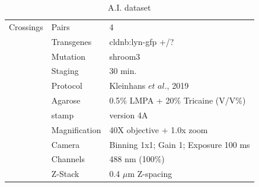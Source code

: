 \documentclass[11pt,singlespacinge,twoside]{reedthesis} %
\theoremstyle{definition}
\theoremstyle{definition}
\theoremstyle{definition}
\theoremstyle{remark}
\begin{document}
\begin{table}[!h]

\caption{\label{tab:imgdatai}A.I. dataset}
\centering
\begin{tabu} to 
\toprule
{}  Crossings & Pairs & 4\\
 & Transgenes & cldnb:lyn-gfp +/?\\

   & Mutation & shroom3\\

 & Staging & 30 min.\\

   & Protocol & Kleinhans $\textit{et al.}$, 2019\\

 & Agarose & 0.5$\%$ LMPA + 20$\%$ Tricaine (V/V$\%$)\\

   & stamp & version 4A\\

 & Magnification & 40X objective + 1.0x zoom\\

   & Camera & Binning 1x1; Gain 1; Exposure 100 ms\\

 & Channels & 488 nm (100$\%$)\\

   & Z-Stack & 0.4 $\mu$m Z-spacing\\
\bottomrule
\end{tabu}
\end{table}
\end{document}

